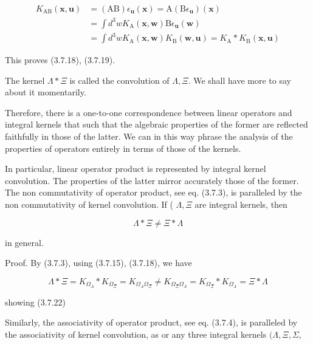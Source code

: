 \documentclass{article}
\begin{document}
\begin{align*}
K_{\mathrm{AB}}(\boldsymbol{x}, \boldsymbol{u}) & =(\mathrm{AB}) \epsilon_{\boldsymbol{u}}(\boldsymbol{x})=\mathrm{A}\left(\mathrm{B} \epsilon_{\boldsymbol{u}}\right)(\boldsymbol{x})  \tag{3.7.21}\\
& =\int d^{3} w K_{\mathrm{A}}(\boldsymbol{x}, \boldsymbol{w}) \mathrm{B} \epsilon_{\boldsymbol{u}}(\boldsymbol{w}) \\
& =\int d^{3} w K_{\mathrm{A}}(\boldsymbol{x}, \boldsymbol{w}) K_{\mathrm{B}}(\boldsymbol{w}, \boldsymbol{u})=K_{\mathrm{A}} * K_{\mathrm{B}}(\boldsymbol{x}, \boldsymbol{u})
\end{align*}
 

This proves (3.7.18), (3.7.19).

The kernel $\Lambda * \Xi$ is called the convolution of $\Lambda, \Xi$. We shall have more to say about it momentarily.

Therefore, there is a one-to-one correspondence between linear operators and integral kernels that such that the algebraic properties of the former are reflected faithfully in those of the latter. We can in this way phrase the analysis of the properties of operators entirely in terms of those of the kernels.

In particular, linear operator product is represented by integral kernel convolution. The properties of the latter mirror accurately those of the former. The non commutativity of operator product, see eq. (3.7.3), is paralleled by the non commutativity of kernel convolution. If ( $\Lambda, \Xi$ are integral kernels, then
 
\begin{equation*}
\Lambda * \Xi \neq \Xi * \Lambda \tag{3.7.22}
\end{equation*}
 
in general.

Proof. By (3.7.3), using (3.7.15), (3.7.18), we have
 
\begin{equation*}
\Lambda * \Xi=K_{\Omega_{\Lambda}} * K_{\Omega_{\Xi}}=K_{\Omega_{\Lambda} \Omega_{\Xi}} \neq K_{\Omega_{\Xi} \Omega_{\Lambda}}=K_{\Omega_{\Xi}} * K_{\Omega_{\Lambda}}=\Xi * \Lambda \tag{3.7.23}
\end{equation*}
 
showing (3.7.22)

Similarly, the associativity of operator product, see eq. (3.7.4), is paralleled by the associativity of kernel convolution, as or any three integral kernels $(\Lambda, \Xi, \Sigma$,
 
\end{document}
